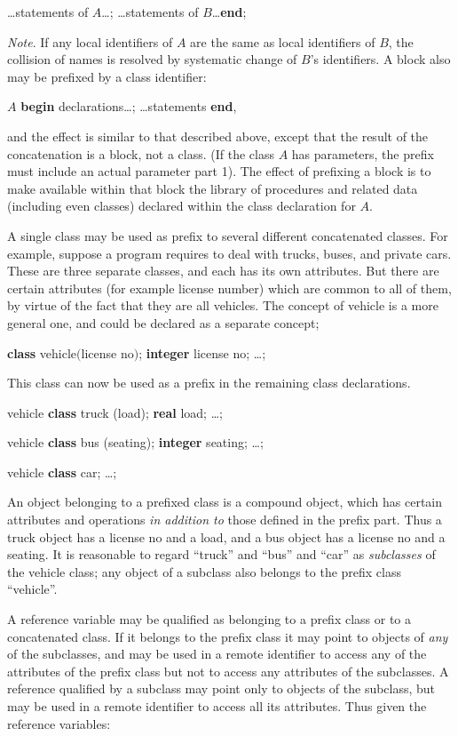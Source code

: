 \documentclass[twoside,11pt]{book}
\begin{document}
\tabto*{5.9em}\dots statements of $A$\dots; \dots statements of $B$\dots \textbf{end};

\textit{Note}. If any local identifiers of $A$ are the same as local identifiers of $B$, the collision of names is resolved by systematic change of $B$'s identifiers. A block also may be prefixed by a class identifier:

\quad $A$ \textbf{begin} declarations\dots; \dots statements \textbf{end},

\noindent
and the effect is similar to that described above, except that the result of the concatenation is a block, not a class. (If the class $A$ has parameters, the prefix must include an actual parameter part 1). The effect of prefixing a block is to make available within that block the library of procedures and related data (including even classes) declared within the class declaration for $A$.

A single class may be used as prefix to several different concatenated classes. For example, suppose a program requires to deal with trucks, buses, and private cars. These are three separate classes, and each has its own attributes. But there are certain attributes (for example license number) which are common to all of them, by virtue of the fact that they are all vehicles. The concept of vehicle is a more general one, and could be declared as a separate concept;

\quad \textbf{class} vehicle$($license no$)$; \textbf{integer} license no; \dots;

\noindent
This class can now be used as a prefix in the remaining class declarations.

\quad vehicle \textbf{class} truck (load); \textbf{real} load; \dots;

\quad vehicle \textbf{class} bus (seating); \textbf{integer} seating; \dots;

\quad vehicle \textbf{class} car; \dots;

An object belonging to a prefixed class is a compound object, which has certain attributes and operations \textit{in addition to} those defined in the prefix part. Thus a truck object has a license no and a load, and a bus object has a license no and a seating. It is reasonable to regard ``truck'' and ``bus'' and ``car'' as \textit{subclasses} of the vehicle class; any object of a subclass also belongs to the prefix class ``vehicle''.

A reference variable may be qualified as belonging to a prefix class or to a concatenated class. If it belongs to the prefix class it may point to objects of \textit{any} of the subclasses, and may be used in a remote identifier to access any of the attributes of the prefix class but not to access any attributes of the subclasses. A reference qualified by a subclass may point only to objects of the subclass, but may be used in a remote identifier to access all its attributes. Thus given the reference variables:
\end{document}
